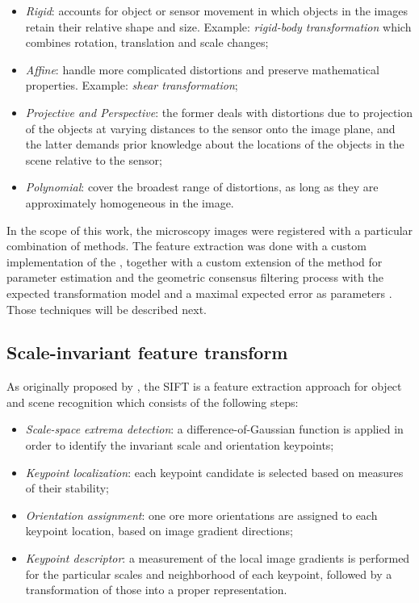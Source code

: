 \begin{itemize}
    \item \emph{Rigid}: accounts for object or sensor movement in which objects in the images retain their relative shape and size. Example: \emph{rigid-body transformation} which combines rotation, translation and scale changes; 
    
    \item \emph{Affine}: handle more complicated distortions and preserve mathematical properties. Example: \emph{shear transformation};
    
    \item \emph{Projective and Perspective}: the former deals with distortions due to projection of the objects at varying distances to the sensor onto the image plane, and the latter demands prior knowledge about the locations of the objects in the scene relative to the sensor;
    
    \item \emph{Polynomial}: cover the broadest range of distortions, as long as they are approximately homogeneous in the image.
\end{itemize}

In the scope of this work, the microscopy images were registered with a particular combination of methods. The feature extraction was done with a custom implementation of the , together with a custom extension of the  method for parameter estimation and the geometric consensus filtering process with the expected transformation model and a maximal expected error as parameters \cite{saalfeld2019computational}. Those techniques will be described next.

\subsection{Scale-invariant feature transform}

As originally proposed by , the SIFT is a feature extraction approach for object and scene recognition which consists of the following steps:

\begin{itemize}
	\item \emph{Scale-space extrema detection}: a difference-of-Gaussian function is applied in order to identify the invariant scale and orientation keypoints;
    
    \item \emph{Keypoint localization}: each keypoint candidate is selected based on measures of their stability;
    
    \item \emph{Orientation assignment}: one ore more orientations are assigned to each keypoint location, based on image gradient directions;
    
    \item \emph{Keypoint descriptor}: a measurement of the local image gradients is performed for the particular scales and neighborhood of each keypoint, followed by a transformation of those into a proper representation.
	
\end{itemize}

